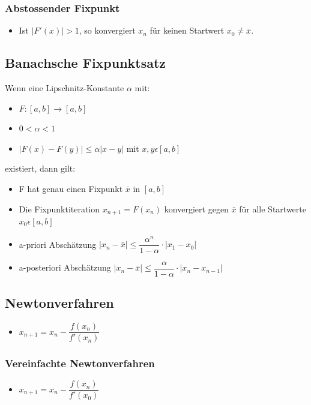\documentclass[8pt,a4paper]{scrartcl}
\begin{document}
\begin{multicols*}{3}
			\subsubsection{Abstossender Fixpunkt}
			\begin{itemize}\itemsep0pt	
					\item Ist $|F'(x)| > 1$, so konvergiert $x_{n}$ für keinen Startwert $x_{0}\neq \bar{x}$.
			\end{itemize}

		\subsection{Banachsche Fixpunktsatz}
			Wenn eine Lipschnitz-Konstante $\alpha$ mit:
			
			\begin{itemize}\itemsep0pt	
				\item $F: [a,b] \rightarrow [a,b]$
				\item $0<\alpha <1$
				\item $|F(x) - F(y)| \leq \alpha |x-y|$ mit $x,y \epsilon [a,b]$
			\end{itemize}
			
			 existiert, dann gilt:
			 
			 \begin{itemize}\itemsep0pt	
				\item F hat genau einen Fixpunkt $\bar{x}$ in $[a,b]$
				\item Die Fixpunktiteration $x_{n+1} = F(x_{n})$ konvergiert gegen $\bar{x}$ für alle Startwerte $x_{0} \epsilon [a,b]$
				\item a-priori Abschätzung $|x_{n} - \bar{x}| \leq \dfrac{\alpha^{n}}{1-\alpha}\cdot |x_{1}-x_{0}|$ 
				
				\item a-posteriori Abschätzung $|x_{n} - \bar{x}| \leq \dfrac{\alpha}{1-\alpha}\cdot |x_{n}-x_{n-1}|$ 
			\end{itemize}
			 
			 
		\subsection{Newtonverfahren}
			\begin{itemize}\itemsep0pt	
				\item $x_{n+1} = x_{n} - \dfrac{f(x_{n})}{f'(x_{n})}$
			\end{itemize}
			\subsubsection{Vereinfachte Newtonverfahren}
				\begin{itemize}\itemsep0pt	
					\item $x_{n+1} = x_{n} - \dfrac{f(x_{n})}{f'(x_{0})}$
				\end{itemize}

\end{multicols*}
\end{document}
